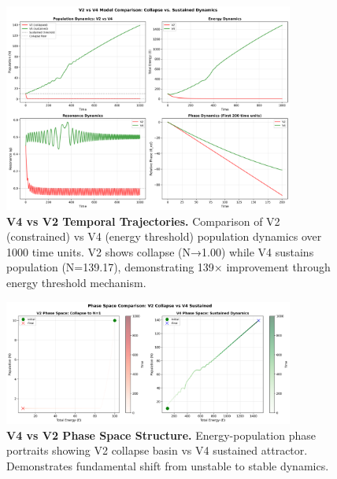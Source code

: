\documentclass[
]{article}
\begin{document}
\begin{figure}[htbp]
\centering
\includegraphics[width=0.85\textwidth]{figures/paper7_fig5_v4_vs_v2_trajectories.png}
\caption{\textbf{V4 vs V2 Temporal Trajectories.} Comparison of V2 (constrained) vs V4 (energy threshold) population dynamics over 1000 time units. V2 shows collapse (N→1.00) while V4 sustains population (N=139.17), demonstrating 139× improvement through energy threshold mechanism.}
\label{fig:v4-trajectories}
\end{figure}

\begin{figure}[htbp]
\centering
\includegraphics[width=0.85\textwidth]{figures/paper7_fig6_v4_vs_v2_phase_space.png}
\caption{\textbf{V4 vs V2 Phase Space Structure.} Energy-population phase portraits showing V2 collapse basin vs V4 sustained attractor. Demonstrates fundamental shift from unstable to stable dynamics.}
\label{fig:v4-phase}
\end{figure}
\end{document}

